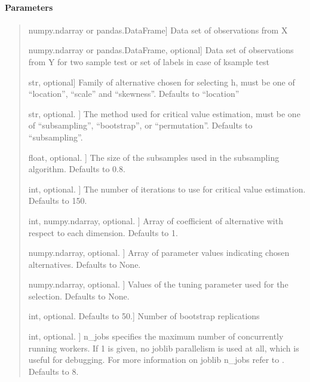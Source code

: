 \documentclass[letterpaper,10pt,english,openany,oneside]{sphinxmanual}
\begin{document}
\begin{fulllineitems}
\paragraph{Parameters}
\label{\detokenize{api_reference/generated/QuadratiK.kernel_test.select_h:parameters}}\begin{quote}
\begin{description}
\sphinxlineitem{x}{[}numpy.ndarray or pandas.DataFrame{]}
\sphinxAtStartPar
Data set of observations from X

\sphinxlineitem{y}{[}numpy.ndarray or pandas.DataFrame, optional{]}
\sphinxAtStartPar
Data set of observations from Y for two sample test
or set of labels in case of k\sphinxhyphen{}sample test

\sphinxlineitem{alternative}{[}str, optional{]}
\sphinxAtStartPar
Family of alternative chosen for selecting h,
must be one of “location”, “scale” and “skewness”.
Defaults to “location”

\sphinxlineitem{method}{[}str, optional. {]}
\sphinxAtStartPar
The method used for critical value estimation, 
must be one of “subsampling”, “bootstrap”, or “permutation”.
Defaults to “subsampling”.

\sphinxlineitem{b}{[}float, optional. {]}
\sphinxAtStartPar
The size of the subsamples used in the subsampling algorithm.
Defaults to 0.8.

\sphinxlineitem{num\_iter}{[}int, optional. {]}
\sphinxAtStartPar
The number of iterations to use for critical value estimation.
Defaults to 150.

\sphinxlineitem{delta\_dim}{[}int, numpy.ndarray, optional. {]}
\sphinxAtStartPar
Array of coefficient of alternative with respect to each dimension.
Defaults to 1.

\sphinxlineitem{delta}{[}numpy.ndarray, optional. {]}
\sphinxAtStartPar
Array of parameter values indicating chosen alternatives.
Defaults to None.

\sphinxlineitem{h\_values}{[}numpy.ndarray, optional. {]}
\sphinxAtStartPar
Values of the tuning parameter used for the selection.
Defaults to None.

\sphinxlineitem{n\_rep}{[}int, optional. Defaults to 50.{]}
\sphinxAtStartPar
Number of bootstrap replications

\sphinxlineitem{n\_jobs}{[}int, optional. {]}
\sphinxAtStartPar
n\_jobs specifies the maximum number of concurrently running workers. 
If 1 is given, no joblib parallelism is used at all, 
which is useful for debugging. For more information on joblib n\_jobs 
refer to \sphinxhyphen{} .
Defaults to 8.


\end{description}
\end{quote}
\end{fulllineitems}
\end{document}
